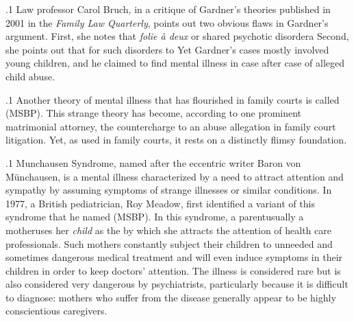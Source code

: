 \documentclass[11pt, twoside]{article}
\begin{document}
{\p.1{%
Law professor Carol Bruch, in a critique of Gardner’s theories published
in 2001 in the \textit{Family Law Quarterly}, points out two obvious
flaws in Gardner’s argument. First, she notes that \textit{folie à deux} or shared
psychotic disorder\mdash{}a  Second, she points out that
for such disorders to  Yet Gardner’s cases mostly involved young children,
and he claimed to find  mental illness in case after case of
alleged child abuse.
}%

\p.1{%
Another theory of  mental illness that has flourished in
family courts is called  (MSBP). This
strange theory has become, according to one prominent matrimonial
attorney, the  countercharge to an abuse allegation in family
court litigation. Yet, as used in family courts, it rests on a distinctly
flimsy foundation.
}%

\p.1{%
Munchausen Syndrome, named after the eccentric writer Baron von
M\"unchausen, is a mental illness characterized by a need to attract attention and sympathy by assuming symptoms of strange illnesses or similar
conditions. In 1977, a British pediatrician, Roy Meadow, first identified
a variant of this syndrome that he named  (MSBP). In this syndrome, a
parent\mdash{}usually a mother\mdash{}uses her \textit{child} as the  by which she attracts the attention of health care professionals. Such mothers constantly
subject their children to unneeded and sometimes dangerous medical
treatment and will even induce symptoms in their children in order to
keep doctors’ attention. The illness is considered rare but is also considered very dangerous by psychiatrists, particularly because it is difficult
to diagnose: mothers who suffer from the disease generally appear to be
highly conscientious caregivers.
}%

}
\end{document}
